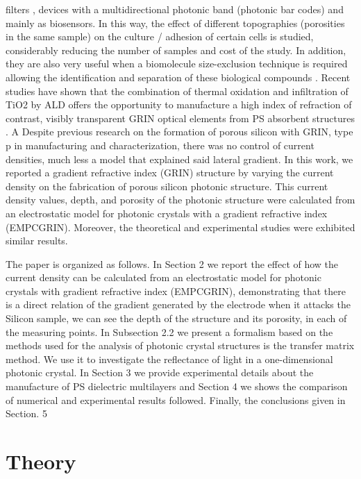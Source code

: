 \documentclass{article}
\begin{document}
filters \cite{I12}, devices with a multidirectional photonic band
(photonic bar codes) \cite{I13} and mainly as biosensors. In this way,
the effect of different topographies (porosities in the same sample)
on the culture / adhesion of certain cells \cite{I14} is studied,
considerably reducing the number of samples and cost of the study. In
addition, they are also very useful when a biomolecule size-exclusion
technique is required allowing the identification and separation of
these biological compounds \cite{I15}. Recent studies  have shown that
the  combination  of thermal  oxidation  and infiltration of TiO2   by
ALD offers the  opportunity to manufacture  a high index of refraction
of contrast, visibly transparent GRIN optical elements from PS
absorbent structures \cite{I16}. A Despite previous research on the
formation of porous silicon with GRIN, type p in manufacturing and
characterization, there was no control of current densities, much less
a model that  explained said lateral  gradient. In this work, we
reported a gradient refractive index (GRIN) structure by varying the
current density on the fabrication of porous silicon photonic
structure. This current density values, depth, and porosity of the
photonic structure were calculated from an electrostatic model for
photonic crystals with a gradient refractive index
(EMPCGRIN). Moreover, the theoretical and experimental studies were
exhibited similar results.

The paper is organized as follows. In Section 2  we report the effect
of how the current density can be calculated from an electrostatic
model for photonic crystals with gradient refractive index (EMPCGRIN),
demonstrating that there is a direct relation of the gradient
generated by the electrode when it attacks the Silicon sample, we can
see the depth of the structure and its porosity, in each of the
measuring points. In Subsection 2.2 we present a formalism based on
the methods used for the analysis of photonic crystal structures is
the transfer matrix method. We use it to investigate the reflectance
of light in a one-dimensional photonic crystal. In Section 3 we
provide experimental  details about the manufacture of PS dielectric
multilayers and Section 4 we shows the comparison of numerical and
experimental results followed. Finally,  the conclusions given in
Section. 5

\section{Theory} \label{sec:theory}
\end{document}
